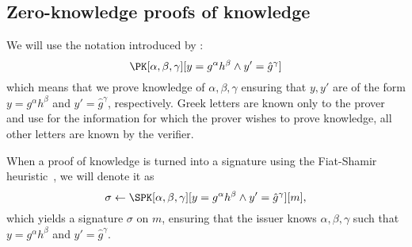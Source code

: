 \subsection{Zero-knowledge proofs of knowledge}%
\label{ZKPK}

We will use the notation introduced by \citet{PKnotation}:
\begin{equation}\label{PKexample}
  \PK[\alpha, \beta, \gamma][y = g^\alpha h^\beta \land y' = \hat g^\gamma]
\end{equation}
which means that we prove knowledge of \(\alpha, \beta, \gamma\) ensuring that \(y, y'\) are of the form \(y = g^\alpha h^\beta\) and \(y' = \hat g^\gamma\), respectively.
Greek letters are known only to the prover and use for the information for which the prover wishes to prove knowledge, all other letters are known by the verifier.

When a proof of knowledge is turned into a signature using the Fiat-Shamir heuristic~\cite{FiatShamirHeuristic}, we will denote it as
\begin{equation*}\label{SPKexample}
  \sigma\gets \SPK[\alpha, \beta, \gamma]%
  [y = g^\alpha h^\beta \land y' = \hat g^\gamma]%
  [m],
\end{equation*}
which yields a signature \(\sigma\) on \(m\), ensuring that the issuer knows \(\alpha, \beta, \gamma\) such that \(y = g^\alpha h^\beta\) and \(y' = \hat{g}^\gamma\).


